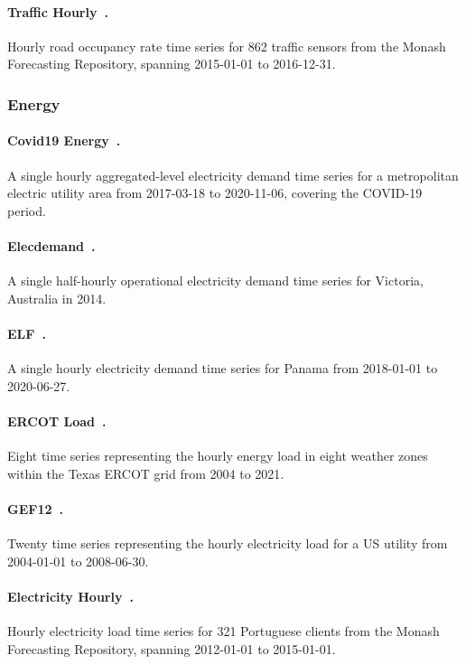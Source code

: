 \documentclass[11pt]{article}
\begin{document}
\paragraph{Traffic Hourly~\citep{godahewa2021monash}.}
Hourly road occupancy rate time series for 862 traffic sensors from the Monash Forecasting Repository, spanning 2015-01-01 to 2016-12-31.

\subsubsection{Energy}

\paragraph{Covid19 Energy~\citep{wang2023benchmarks}.}
A single hourly aggregated-level electricity demand time series for a metropolitan electric utility area from 2017-03-18 to 2020-11-06, covering the COVID-19 period.

\paragraph{Elecdemand~\citep{godahewa2021monash}.}
A single half-hourly operational electricity demand time series for Victoria, Australia in 2014.

\paragraph{ELF~\citep{wang2023benchmarks}.}
A single hourly electricity demand time series for Panama from 2018-01-01 to 2020-06-27.

\paragraph{ERCOT Load~\citep{ansarichronos}.}
Eight time series representing the hourly energy load in eight weather zones within the Texas ERCOT grid from 2004 to 2021.

\paragraph{GEF12~\citep{wang2023benchmarks}.}
Twenty time series representing the hourly electricity load for a US utility from 2004-01-01 to 2008-06-30.

\paragraph{Electricity Hourly~\citep{godahewa2021monash}.}
Hourly electricity load time series for 321 Portuguese clients from the Monash Forecasting Repository, spanning 2012-01-01 to 2015-01-01.
\end{document}
